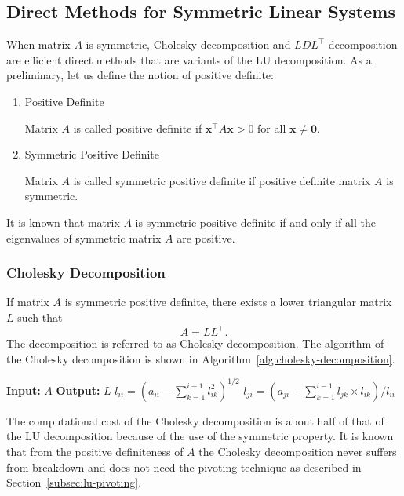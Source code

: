 \subsection{{Direct Methods for Symmetric Linear Systems}}\label{sec:symmetric-direct-methods}
{When matrix $A$ is symmetric, Cholesky decomposition and $LDL^\top$ decomposition are efficient direct methods that are variants of the LU decomposition. As a preliminary, let us define the notion of positive definite:}
\begin{enumerate}
\item {Positive Definite}
\par{Matrix $A$ is called positive definite if $\bm x^\top A\bm x>0$ for all $\bm x\ne\bm0$.}
\item {Symmetric Positive Definite}
\par{Matrix $A$ is called symmetric positive definite if positive definite matrix $A$ is symmetric.}
\end{enumerate}
{It is known that matrix $A$ is symmetric positive definite if and only if all the eigenvalues of symmetric matrix $A$ are positive.}
\subsubsection{{Cholesky Decomposition}}\label{subsec:cholesky-decomposition}
{If matrix $A$ is symmetric positive definite, there exists a lower triangular matrix $L$ such that}
\[A=LL^\top.\]
{The decomposition is referred to as Cholesky decomposition. The algorithm of the Cholesky decomposition is shown in Algorithm~\ref{alg:cholesky-decomposition}.}
\begin{algorithm}[H]
\caption{{Cholesky decomposition}}\label{alg:cholesky-decomposition}
\begin{algorithmic}[1]
\Statex\textbf{Input:} $A$
\Statex\textbf{Output:} $L$
\State $l_{ii}=(a_{ii}-\sum_{k=1}^{i-1}l_{ik}^2)^{1/2}$
\State $l_{ji}=(a_{ji}-\sum_{k=1}^{i-1}l_{jk}\times l_{ik})/l_{ii}$
\EndFor
\EndFor
\end{algorithmic}
\end{algorithm}
{The computational cost of the Cholesky decomposition is about half of that of the LU decomposition because of the use of the symmetric property.}
{It is known that from the positive definiteness of $A$ the Cholesky decomposition never suffers from breakdown and does not need the pivoting technique as described in Section~\ref{subsec:lu-pivoting}.}
